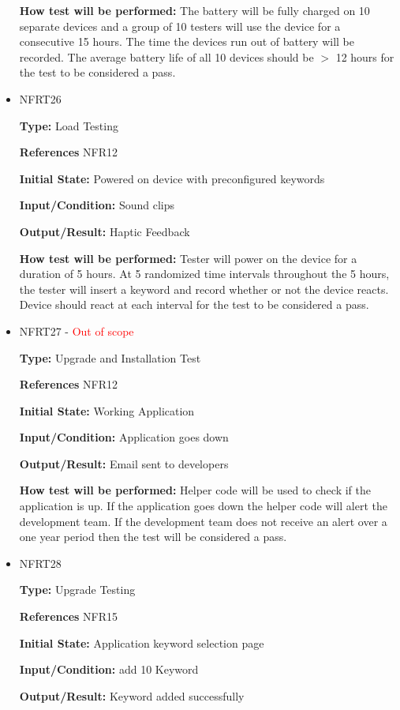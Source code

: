 \documentclass[12pt, titlepage]{article}
\begin{document}
\begin{itemize}
\textbf{How test will be performed:} The battery will be fully charged on 10 separate devices and a group of 10  testers will use the device for a consecutive 15 hours. The time the devices run out of battery will be recorded. The average battery life of all 10 devices should be 	$>$ 12 hours for the test to be considered a pass.

\item{NFRT26}

\textbf{Type:} Load Testing 

\textbf{References} NFR12
					
\textbf{Initial State:} Powered on device with preconfigured keywords 
					
\textbf{Input/Condition:} Sound clips
					
\textbf{Output/Result:} Haptic Feedback
					
\textbf{How test will be performed:} Tester will power on the device for a duration of 5 hours. At 5 randomized time intervals throughout the 5 hours, the tester will insert a keyword and record whether or not the device reacts. Device should react at each interval for the test to be considered a pass.

\item{NFRT27 - \textcolor{red}{Out of scope}}

\textbf{Type:} Upgrade and Installation Test

\textbf{References} NFR12
					
\textbf{Initial State:} Working Application
					
\textbf{Input/Condition:} Application goes down
					
\textbf{Output/Result:} Email sent to developers
					
\textbf{How test will be performed:} Helper code will be used to check if the application is up. If the application goes down the helper code will alert the development team. If the development team does not receive an alert over a one year period then the test will be considered a pass. 

\item{NFRT28}

\textbf{Type:} Upgrade Testing

\textbf{References} NFR15
					
\textbf{Initial State:} Application keyword selection page
					
\textbf{Input/Condition:} add 10 Keyword
					
\textbf{Output/Result:} Keyword added successfully
					

\end{itemize}
\end{document}
